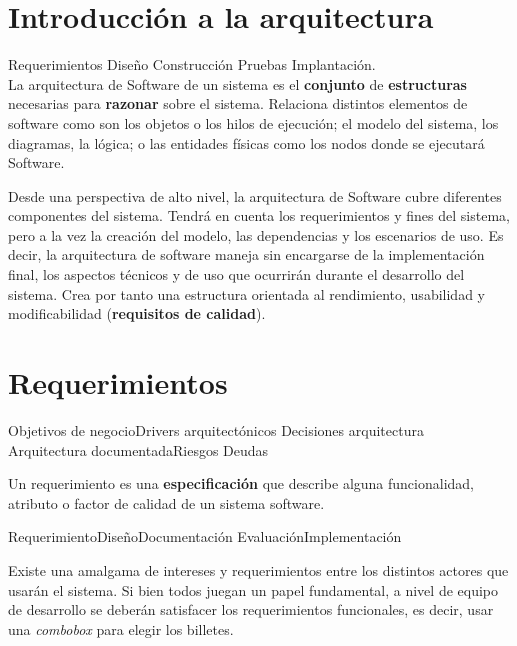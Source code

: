
\section{Introducción a la arquitectura}
\label{sec:arquitectura:intro}

Requerimientos \textrightarrow Diseño \textrightarrow Construcción
\textrightarrow Pruebas \textrightarrow Implantación.
\\

La arquitectura de Software de un sistema es el \textbf{conjunto} de 
\textbf{estructuras} necesarias para \textbf{razonar} sobre el
sistema. Relaciona distintos elementos de software como son los
objetos o los hilos de ejecución; el modelo del sistema,
los diagramas, la lógica; o las entidades físicas como los nodos donde
se ejecutará Software.

Desde una perspectiva de alto nivel, la arquitectura de Software cubre
diferentes componentes del sistema. Tendrá en cuenta los
requerimientos y fines del sistema, pero a la vez la creación del
modelo, las dependencias y los escenarios de uso. Es decir, la
arquitectura de software maneja sin encargarse de la implementación
final, los aspectos técnicos y de uso que ocurrirán durante el
desarrollo del sistema. Crea por tanto una estructura orientada al
rendimiento, usabilidad y modificabilidad (\textbf{requisitos de calidad}).

\section{Requerimientos}
\label{sec:arquitectura:requerimientos}

Objetivos de negocio\textrightarrow Drivers arquitectónicos
\textrightarrow Decisiones arquitectura\textrightarrow\\ Arquitectura
documentada\textrightarrow Riesgos Deudas
\\\par
Un requerimiento es una \textbf{especificación} que describe alguna
funcionalidad, atributo o factor de calidad de un sistema software.
\\\par
Requerimiento\textrightarrow Diseño\textrightarrow Documentación
\textrightarrow Evaluación\textrightarrow Implementación

Existe una amalgama de intereses y requerimientos entre los distintos
actores que usarán el sistema. Si bien todos juegan un papel
fundamental, a nivel de equipo de desarrollo se deberán satisfacer los
requerimientos funcionales, es decir, usar una \emph{combobox} para
elegir los billetes.\cite[p.~14]{IS1ArquitecturaDia1}

